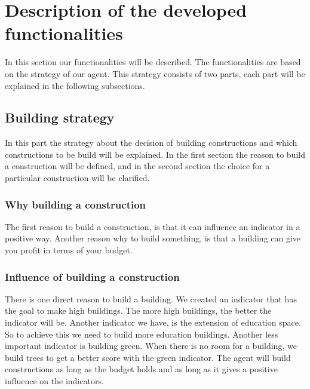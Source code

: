 \section{Description of the developed functionalities}
In this section our functionalities will be described. The functionalities are based on the strategy of our agent. This strategy consists of two parts, each part will be explained in the following subsections.

\subsection{Building strategy}
In this part the strategy about the decision of building constructions and which constructions to be build will be explained. In the first section the reason to build a construction will be defined, and in the second section the choice for a particular construction will be clarified. 

\subsubsection{Why building a construction}
The first reason to build a construction, is that it can influence an indicator in a positive way. Another reason why to build something, is that a building can give you profit in terms of your budget.

\subsubsection{Influence of building a construction}
There is one direct reason to build a building. We created an indicator that has the goal to make high buildings. The more high buildings, the better the indicator will be. Another indicator we have, is the extension of education space. So to achieve this we need to build more education buildings. Another less important indicator is building green. When there is no room for a building, we build trees to get a better score with the green indicator. The agent will build constructions as long as the budget holds and as long as it gives a positive influence on the indicators.

